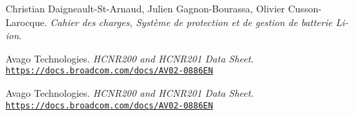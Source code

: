 \documentclass[12pt,letterpaper]{article}
\begin{document}
	
	\hypersetup{pageanchor=false}
	
	\newpage
	\hypersetup{pageanchor=true}
	\tableofcontents


	
	
	
	

	

	
		
	
	
	

	
	

	
	
	
	


	\begin{thebibliography}{10}
	
	Christian Daigneault-St-Arnaud, Julien Gagnon-Bourassa, Olivier Cusson-Larocque. \textit{Cahier des charges, Système de protection et de gestion de batterie Li-ion}. \par	
	
	Avago Technologies. \textit{HCNR200 and HCNR201 Data Sheet}.\\ \texttt{\url{https://docs.broadcom.com/docs/AV02-0886EN}}\par

	Avago Technologies. \textit{HCNR200 and HCNR201 Data Sheet}.\\ \texttt{\url{https://docs.broadcom.com/docs/AV02-0886EN}}\par	
	
	
	\end{thebibliography}	
	
\end{document}
